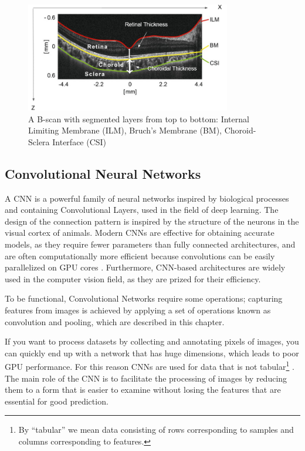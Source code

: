 \documentclass[12pt,a4paper]{scrartcl}
\begin{document}
\begin{figure}[H]
    \centering
    \includegraphics[width=0.8\textwidth]{./images/OCT-Scan.png}
    \caption{A B-scan with segmented layers from top to bottom:  Internal Limiting Membrane (ILM),  Bruch's Membrane (BM), Choroid-Sclera Interface (CSI) \cite{Ronchetti2019}}
    \label{fig:annotated-oct-scan}
\end{figure}

\subsection{Convolutional Neural Networks}\label{s:cnn}

A CNN is a powerful family of neural networks inspired by biological processes and containing Convolutional Layers, used in the field of deep learning. The design of the connection pattern is inspired by the structure of the neurons in the visual cortex of animals. Modern CNNs are effective for obtaining accurate models, as they require fewer parameters than fully connected architectures, and are often computationally more efficient because convolutions can be easily parallelized on GPU cores \cite{DIDLBook}. Furthermore, CNN-based architectures are widely used in the computer vision field, as they are prized for their efficiency. 

To be functional, Convolutional Networks require some operations; capturing features from images is achieved by applying a set of operations known as convolution and pooling, which are described in this chapter. 

If you want to process datasets by collecting and annotating pixels of images, you can quickly end up with a network that has huge dimensions, which leads to poor GPU performance. For this reason CNNs are used for data that is not tabular\footnote{By ``tabular'' we mean data consisting of rows corresponding to samples and columns corresponding to features.} \cite{DIDLBook}. The main role of the CNN is to facilitate the processing of images by reducing them to a form that is easier to examine without losing the features that are essential for good prediction.
\end{document}
